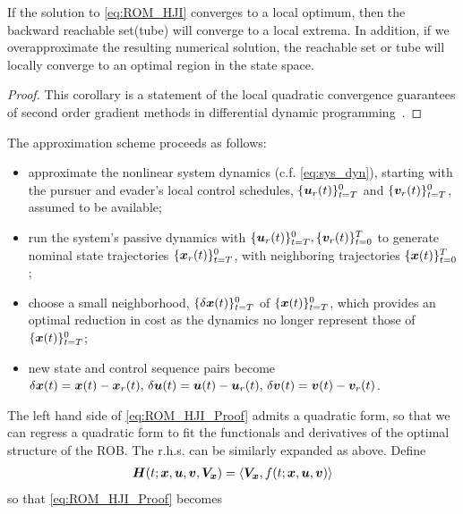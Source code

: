 \begin{corollary}
	If the solution to \eqref{eq:ROM_HJI} converges to a local optimum, then the backward reachable set(tube) will converge to a local extrema. In addition, if we overapproximate the resulting numerical solution, the reachable set or tube will locally converge to an optimal region in the state space.
\end{corollary}

\begin{proof}
	This corollary is a statement of the local quadratic convergence guarantees of second order gradient methods in differential dynamic programming~\cite{Shoemaker1991}.
\end{proof}
The approximation scheme proceeds as follows:
%
\begin{itemize}
	\item approximate the nonlinear system dynamics (c.f. \eqref{eq:sys_dyn}), starting with the pursuer and evader's local control schedules, $\{ \bm{u}_r(t)\}_{t=T}^0$ and $\{ \bm{v}_r(t) \}_{t=T}^0$, assumed to be available; %
	\item  run the system's passive dynamics with $\{\bm{u}_r(t)\}_{t=T}^0, \{ {\bm{v}_r(t)} \}_{t=0}^T$ to generate  nominal state trajectories $ \{\bm{x}_r(t)\}_{t=T}^0$, with neighboring trajectories $\{ \bm{x}(t) \}_{t=0}^T$; %
	\item choose a small neighborhood, $\{\delta \bm{x}(t)\}_{t=T}^0$ of $\{\bm{x}(t)\}_{t=T}^0$, which provides an optimal reduction in cost as the dynamics no longer represent those of $\{\bm{x}(t)\}_{t=T}^0$;
	\item   new state and control sequence pairs become $\delta \bm{x}(t) = \bm{x}(t) - \bm{x}_r(t), \,
	\delta \bm{u}(t) = \bm{u}(t) - \bm{u}_r(t), \,
	\delta \bm{v}(t) = \bm{v}(t) - \bm{v}_r(t)$.
\end{itemize}
%
The left hand side of \eqref{eq:ROM_HJI_Proof} admits a quadratic form, so that we can regress a quadratic form to fit the functionals and derivatives of the optimal structure of the ROB. The r.h.s. can be similarly expanded as above.   Define 
%
\begin{align}
	\bm{H}(t; \bm{x}, \bm{u}, \bm{v}, \bm{V}_{\bm{x}}) = \langle \bm{V}_{\bm{x}}, f(t; \bm{x}, \bm{u}, \bm{v}) \rangle 
\end{align}
%
so that \eqref{eq:ROM_HJI_Proof} becomes
%
